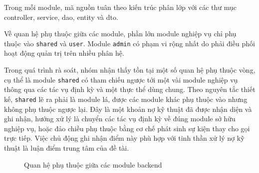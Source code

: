 \documentclass[12pt,a4paper,oneside]{report}
\begin{document}
Trong mỗi module, mã nguồn tuân theo kiến trúc phân lớp với các thư mục controller, service, dao, entity và dto.

Về quan hệ phụ thuộc giữa các module, phần lớn module nghiệp vụ chỉ phụ thuộc vào \texttt{shared} và \texttt{user}. Module \texttt{admin} có phạm vi rộng nhất do phải điều phối hoạt động quản trị trên nhiều phân hệ.

Trong quá trình rà soát, nhóm nhận thấy tồn tại một số quan hệ phụ thuộc vòng, cụ thể là module \texttt{shared} có tham chiếu ngược tới một vài module nghiệp vụ thông qua các tác vụ định kỳ và một thực thể dùng chung. Theo nguyên tắc thiết kế, \texttt{shared} lẽ ra phải là module lá, được các module khác phụ thuộc vào nhưng không phụ thuộc ngược lại. Đây là một khoản nợ kỹ thuật đã được nhận diện và ghi nhận, hướng xử lý là chuyển các tác vụ định kỳ về đúng module sở hữu nghiệp vụ, hoặc đảo chiều phụ thuộc bằng cơ chế phát sinh sự kiện thay cho gọi trực tiếp. Việc chủ động ghi nhận điểm này phù hợp với tinh thần xử lý nợ kỹ thuật là luận điểm trung tâm của đề tài.

\begin{figure}[H]\centering
{}
\caption{Quan hệ phụ thuộc giữa các module backend}
\label{fig:moduledeps}
\end{figure}
\end{document}
